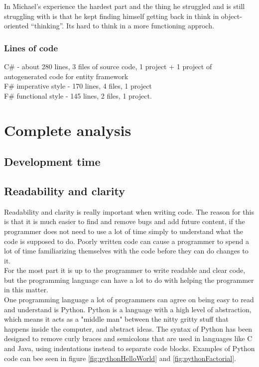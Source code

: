 \documentclass[12pt, a4paper]{article}
\begin{document}
In Michael’s experience the hardest part and the thing he struggled and is still struggling with is that he kept finding himself getting back in think in object-oriented “thinking”. Its hard to think in a more functioning approch.
\subsubsection{Lines of code}
C\# - about 280 lines, 3 files of source code, 1 project + 1 project of autogenerated code for entity framework\\
F\# imperative style - 170 lines, 4 files, 1 project\\

F\# functional style - 145 lines, 2 files, 1 project.
\newpage

\section{Complete analysis}
\subsection{Development time}

\newpage
\subsection{Readability and clarity}
Readability and clarity is really important when writing code. The reason for this is that it is much easier to find and remove bugs and add future content, if the programmer does not need to use a lot of time simply to understand what the code is supposed to do. Poorly written code can cause a programmer to spend a lot of time familiarizing themselves with the code before they can do changes to it.\\

For the most part it is up to the programmer to write readable and clear code, but the programming language can have a lot to do with helping the programmer in this matter.\\

One programming language a lot of programmers can agree on being easy to read and understand is Python. Python is a language with a high level of abstraction, which means it acts as a "middle man" between the nitty gritty stuff that happens inside the computer, and abstract ideas. The syntax of Python has been designed to remove curly braces and semicolons that are used in languages like C and Java, using indentations instead to separate code blocks. Examples of Python code can bee seen in figure \ref{fig:pythonHelloWorld} and \ref{fig:pythonFactorial}.\\
\end{document}
